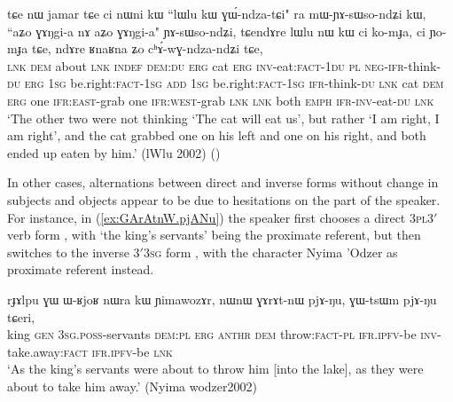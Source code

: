 \begin{exe}
\ex \label{ex:RnaRna.Zo.chAwGndzandZi}
\gll tɕe nɯ jamar tɕe ci nɯni kɯ ``lɯlu kɯ ɣɯ́-ndza-tɕi" ra mɯ-ɲɤ-sɯso-ndʑi kɯ, ``aʑo ɣɤŋgi-a nɤ aʑo ɣɤŋgi-a" ɲɤ-sɯso-ndʑi, tɕendɤre lɯlu nɯ kɯ ci ko-mɟa, ci ɲo-mɟa tɕe, ndɤre ʁnaʁna ʑo cʰɤ́-wɣ-ndza-ndʑi tɕe, \\
\textsc{lnk} \textsc{dem} about \textsc{lnk} \textsc{indef} \textsc{dem}:\textsc{du} \textsc{erg} cat \textsc{erg} \textsc{inv}-eat:\textsc{fact}-\textsc{1du} \textsc{pl} \textsc{neg}-\textsc{ifr}-think-\textsc{du} \textsc{erg} \textsc{1sg} be.right:\textsc{fact}-\textsc{1sg} \textsc{add} \textsc{1sg} be.right:\textsc{fact}-\textsc{1sg} \textsc{ifr}-think-\textsc{du} \textsc{lnk} cat \textsc{dem} \textsc{erg} one \textsc{ifr}:\textsc{east}-grab one \textsc{ifr}:\textsc{west}-grab \textsc{lnk} \textsc{lnk} both \textsc{emph} \textsc{ifr}-\textsc{inv}-eat-\textsc{du} \textsc{lnk} \\
\glt `The other two were not thinking `The cat will eat us', but rather `I am right, I am right', and the cat grabbed one on his left and one on his right, and both ended up eaten by him.' (lWlu 2002)
()
\end{exe} 

In other cases, alternations between direct and inverse forms without change in subjects and objects appear to be due to hesitations on the part of the speaker. For instance, in (\ref{ex:GArAtnW.pjANu}) the speaker first chooses a direct \textsc{3pl}\fl{}3$'$ verb form , with  `the king's servants' being the proximate referent, but then switches to the inverse 3$'$\fl{}\textsc{3sg} form , with the character Nyima 'Odzer as proximate referent instead.

\begin{exe}
\ex \label{ex:GArAtnW.pjANu}
\gll  rɟɤlpu ɣɯ ɯ-ʁjoʁ nɯra kɯ ɲimawozɤr, nɯnɯ ɣɤrɤt-nɯ pjɤ-ŋu, ɣɯ-tsɯm pjɤ-ŋu tɕeri, \\
king \textsc{gen} \textsc{3sg}.\textsc{poss}-servants \textsc{dem}:\textsc{pl} \textsc{erg}  \textsc{anthr} \textsc{dem} throw:\textsc{fact}-\textsc{pl} \textsc{ifr}.\textsc{ipfv}-be \textsc{inv}-take.away:\textsc{fact} \textsc{ifr}.\textsc{ipfv}-be \textsc{lnk} \\
\glt `As the king's servants were about to throw him [into the lake], as they were about to take him away.' (Nyima wodzer2002)
\end{exe}


